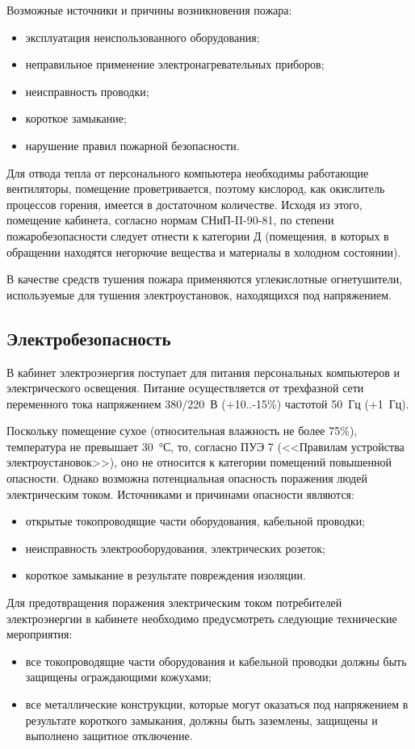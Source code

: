 Возможные источники и причины возникновения пожара:
\begin{itemize}
  \item эксплуатация неиспользованного оборудования;
  \item неправильное применение электронагревательных приборов;
  \item неисправность проводки;
  \item короткое замыкание;
  \item нарушение правил пожарной безопасности.
\end{itemize}

Для отвода тепла от персонального компьютера необходимы работающие вентиляторы, помещение проветривается, поэтому кислород, как окислитель процессов горения, имеется в достаточном количестве.
Исходя из этого, помещение кабинета, согласно нормам СНиП-II-90-81, по степени пожаробезопасности следует отнести к категории Д (помещения, в которых в обращении находятся негорючие вещества и материалы в холодном состоянии).

В качестве средств тушения пожара применяются углекислотные огнетушители, используемые для тушения электроустановок, находящихся под напряжением.

\subsection{Электробезопасность}

В кабинет электроэнергия поступает для питания персональных компьютеров и электрического освещения.
Питание осуществляется от трехфазной сети переменного тока напряжением 380/220~В (+10..-15\%) частотой 50~Гц (+1~Гц).

Поскольку помещение сухое (относительная влажность не более 75\%), температура не превышает 30~°С, то, согласно ПУЭ 7 (<<Правилам устройства электроустановок>>), оно не относится к категории помещений повышенной опасности.
Однако возможна потенциальная опасность поражения людей электрическим током.
Источниками и причинами опасности являются:
\begin{itemize}
  \item открытые токопроводящие части оборудования, кабельной проводки;
  \item неисправность электрооборудования, электрических розеток;
  \item короткое замыкание в результате повреждения изоляции.
\end{itemize}

Для предотвращения поражения электрическим током потребителей электроэнергии в кабинете необходимо предусмотреть следующие технические мероприятия:
\begin{itemize}
  \item все токопроводящие части оборудования и кабельной проводки должны быть защищены ограждающими кожухами;
  \item все металлические конструкции, которые могут оказаться под напряжением в результате короткого замыкания, должны быть заземлены, защищены и выполнено защитное   отключение.
\end{itemize}


